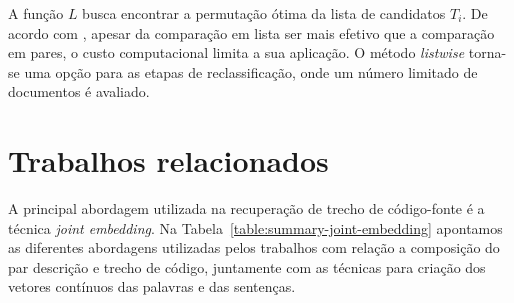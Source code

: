 A função $L$ busca encontrar a permutação ótima da lista de candidatos $T_{i}$. De acordo com \cite{guo-deep-look-into-neural-ranking-models:2019}, apesar da comparação em lista ser mais efetivo que a comparação em pares, o custo computacional limita a sua aplicação. O método \textit{listwise} torna-se uma opção para as etapas de reclassificação, onde um número limitado de documentos é avaliado. 

\section{Trabalhos relacionados}\label{sec:code-retrieval-trabalhos-relacionados}

A principal abordagem utilizada na recuperação de trecho de código-fonte é a técnica \textit{joint embedding}. Na Tabela~\ref{table:summary-joint-embedding} apontamos as diferentes abordagens utilizadas pelos trabalhos com relação a composição do par descrição e trecho de código, juntamente com as técnicas para criação dos vetores contínuos das palavras e das sentenças.


